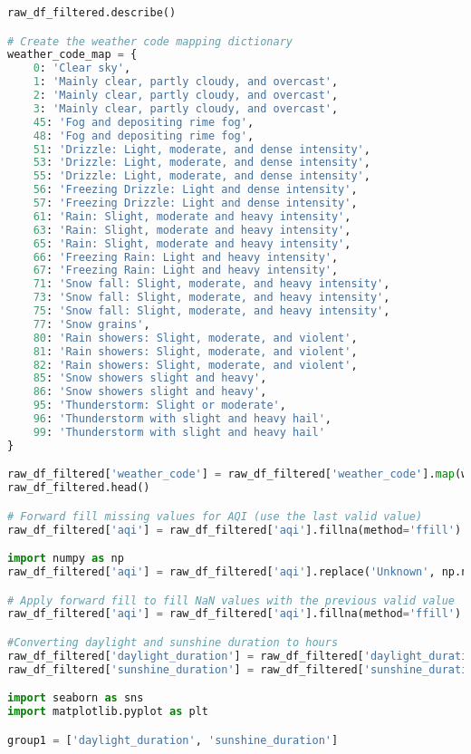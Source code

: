\documentclass[a4paper, 12pt]{article}
\begin{document}
\begin{lstlisting}[language=Python, caption=Data Cleaning Code]
raw_df_filtered.describe()

# Create the weather code mapping dictionary
weather_code_map = {
    0: 'Clear sky',
    1: 'Mainly clear, partly cloudy, and overcast',
    2: 'Mainly clear, partly cloudy, and overcast',
    3: 'Mainly clear, partly cloudy, and overcast',
    45: 'Fog and depositing rime fog',
    48: 'Fog and depositing rime fog',
    51: 'Drizzle: Light, moderate, and dense intensity',
    53: 'Drizzle: Light, moderate, and dense intensity',
    55: 'Drizzle: Light, moderate, and dense intensity',
    56: 'Freezing Drizzle: Light and dense intensity',
    57: 'Freezing Drizzle: Light and dense intensity',
    61: 'Rain: Slight, moderate and heavy intensity',
    63: 'Rain: Slight, moderate and heavy intensity',
    65: 'Rain: Slight, moderate and heavy intensity',
    66: 'Freezing Rain: Light and heavy intensity',
    67: 'Freezing Rain: Light and heavy intensity',
    71: 'Snow fall: Slight, moderate, and heavy intensity',
    73: 'Snow fall: Slight, moderate, and heavy intensity',
    75: 'Snow fall: Slight, moderate, and heavy intensity',
    77: 'Snow grains',
    80: 'Rain showers: Slight, moderate, and violent',
    81: 'Rain showers: Slight, moderate, and violent',
    82: 'Rain showers: Slight, moderate, and violent',
    85: 'Snow showers slight and heavy',
    86: 'Snow showers slight and heavy',
    95: 'Thunderstorm: Slight or moderate',
    96: 'Thunderstorm with slight and heavy hail',
    99: 'Thunderstorm with slight and heavy hail'
}

raw_df_filtered['weather_code'] = raw_df_filtered['weather_code'].map(weather_code_map)
raw_df_filtered.head()

# Forward fill missing values for AQI (use the last valid value)
raw_df_filtered['aqi'] = raw_df_filtered['aqi'].fillna(method='ffill')

import numpy as np
raw_df_filtered['aqi'] = raw_df_filtered['aqi'].replace('Unknown', np.nan)

# Apply forward fill to fill NaN values with the previous valid value
raw_df_filtered['aqi'] = raw_df_filtered['aqi'].fillna(method='ffill')

#Converting daylight and sunshine duration to hours
raw_df_filtered['daylight_duration'] = raw_df_filtered['daylight_duration'] / 3600
raw_df_filtered['sunshine_duration'] = raw_df_filtered['sunshine_duration'] / 3600

import seaborn as sns
import matplotlib.pyplot as plt

group1 = ['daylight_duration', 'sunshine_duration']


\end{lstlisting}
\end{document}
